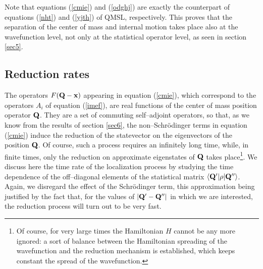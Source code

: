 \documentclass[12pt]{article}
\begin{document}
Note that equations (\ref{cmie}) and (\ref{odghj}) are exactly the
counterpart of equations (\ref{nht}) and (\ref{yjth}) of QMSL,
respectively. This proves that the separation of the center of
mass and internal motion takes place also at the wavefunction
level, not only at the statistical operator level, as seen in
section \ref{sec5}.




\subsection{Reduction rates} \label{sec73}

The operators $F({\bf Q}-{\bf x})$ appearing in equation
(\ref{cmie}), which correspond to the operators $A_{i}$ of
equation (\ref{imef}), are real functions of the center  of mass
position operator ${\bf Q}$. They are a set of commuting
self--adjoint operators, so that, as we know from the results of
section \ref{sec6}, the non--Schr\"odinger terms in equation
(\ref{cmie}) induce the reduction of the statevector on the
eigenvectors of the position ${\bf Q}$. Of course, such a process
requires an infinitely long time, while, in finite times, only the
reduction on approximate eigenstates of ${\bf Q}$ takes
place\footnote{Of course, for very large times the Hamiltonian $H$
cannot be any more ignored: a sort of balance between the
Hamiltonian spreading of the wavefunction and the reduction
mechanism is established, which keeps constant the spread of the
wavefunction.}. We discuss here the time rate of the localization
process by studying the time dependence of the off--diagonal
elements of the statistical matrix $\langle {\bf Q}'| \rho |{\bf
Q}'' \rangle$. Again, we disregard the effect of the Schr\"odinger
term, this approximation being justified by the fact that, for the
values of $|{\bf Q}' - {\bf Q}''|$ in which we are interested, the
reduction process will turn out to be very fast.
\end{document}
